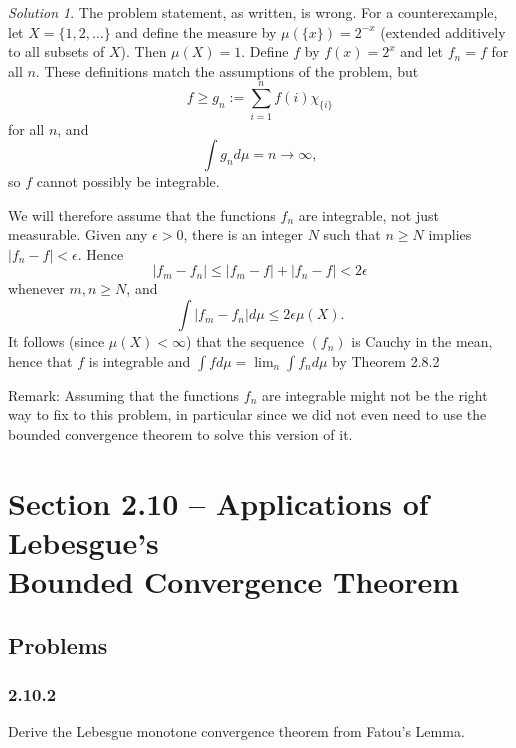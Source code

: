 \documentclass{report}
\theoremstyle{remark}
\newtheorem*{solution}{Solution}
\begin{document}
\begin{solution}
  The problem statement, as written, is wrong. For a counterexample, let $X = \{1,2, \dots\}$ and define the measure by $\mu(\{x\}) = 2^{-x}$ (extended additively to all subsets of $X$). Then $\mu(X) = 1$. Define $f$ by $f(x) = 2^x$ and let $f_n = f$ for all $n$. These definitions match the assumptions of the problem, but
  \begin{equation*}
    f \ge g_n := \sum_{i=1}^n f(i) \chi_{\{i\}}
  \end{equation*}
  for all $n$, and
  \begin{equation*}
    \int g_n d\mu = n \to \infty,
  \end{equation*}
  so $f$ cannot possibly be integrable.

  We will therefore assume that the functions $f_n$ are integrable, not just measurable. Given any $\epsilon > 0$, there is an integer $N$ such that $n \ge N$ implies $|f_n - f| < \epsilon$. Hence
  \begin{equation*}
    |f_m - f_n| \le |f_m - f| + |f_n - f| < 2 \epsilon
  \end{equation*}
  whenever $m,n \ge N$, and
  \begin{equation*}
    \int |f_m - f_n| d\mu \le 2 \epsilon \mu(X).
  \end{equation*}
  It follows (since $\mu(X) < \infty$) that the sequence $(f_n)$ is Cauchy in the mean, hence that $f$ is integrable and $\int f d\mu = \lim_n \int f_n d\mu$ by Theorem 2.8.2

  Remark: Assuming that the functions $f_n$ are integrable might not be the right way to fix to this problem, in particular since we did not even need to use the bounded convergence theorem to solve this version of it.

\end{solution}


\section*{Section 2.10 -- Applications of Lebesgue's \\ Bounded Convergence Theorem}

\subsection*{Problems}

\subsubsection*{2.10.2}
Derive the Lebesgue monotone convergence theorem from Fatou's Lemma.
\end{document}
